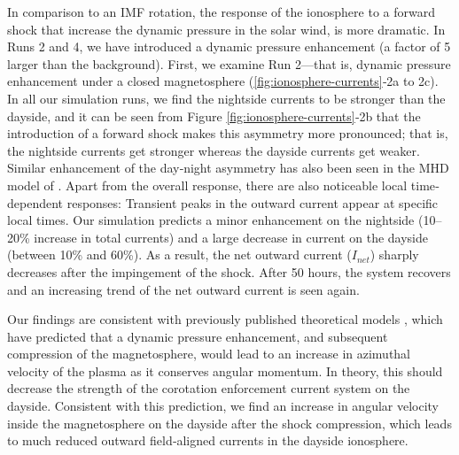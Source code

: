 In comparison to an IMF rotation, the response of the ionosphere to a forward shock that increase the dynamic pressure in the solar wind, is more dramatic. In Runs 2 and 4, we have introduced a dynamic pressure enhancement (a factor of 5 larger than the background). First, we examine Run 2—that is, dynamic pressure enhancement under a closed magnetosphere (\ref{fig:ionosphere-currents}‐2a to 2c). In all our simulation runs, we find the nightside currents to be stronger than the dayside, and it can be seen from Figure \ref{fig:ionosphere-currents}‐2b that the introduction of a forward shock makes this asymmetry more pronounced; that is, the nightside currents get stronger whereas the dayside currents get weaker. Similar enhancement of the day‐night asymmetry has also been seen in the MHD model of \cite{Chane2017a}. Apart from the overall response, there are also noticeable local time‐dependent responses: Transient peaks in the outward current appear at specific local times. Our simulation predicts a minor enhancement on the nightside (10–20\% increase in total currents) and a large decrease in current on the dayside (between 10\% and 60\%). As a result, the net outward current ($I_{net}$) sharply decreases after the impingement of the shock. After 50 hours, the system recovers and an increasing trend of the net outward current is seen again. 

Our findings are consistent with previously published theoretical models 
\cite{Cowley2003a,Cowley2007,Southwood2001a}, which have predicted that a dynamic pressure enhancement, and subsequent compression of the magnetosphere, would lead to an increase in azimuthal velocity of the plasma as it conserves angular momentum. In theory, this should decrease the strength of the corotation enforcement current system on the dayside. Consistent with this prediction, we find an increase in angular velocity inside the magnetosphere on the dayside after the shock compression, which leads to much reduced outward field‐aligned currents in the dayside ionosphere. 

